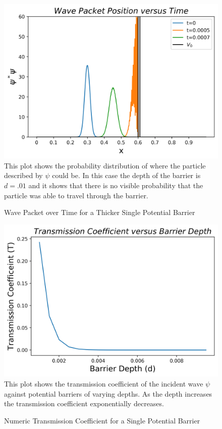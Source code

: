 \documentclass[twocolumn]{article}
\begin{document}
\begin{figure}[ht]
\centering
\caption{Wave Packet over Time for a Thicker Single Potential Barrier}
\includegraphics[scale=.5]{Position2b}
\small{This plot shows the probability distribution of where the particle described by $\psi$ could be. In this case the depth of the barrier is $d=.01$ and it shows that there is no visible probability that the particle was able to travel through the barrier.}
\end{figure}
\begin{figure}[h]
\centering
\caption{Numeric Transmission Coefficient for a Single Potential Barrier}
\includegraphics[scale=.5]{TransmissionD}
\small{This plot shows the transmission coefficient of the incident wave $\psi$ against potential barriers of varying depths. As the depth increases the transmission coefficient exponentially decreases.}
\end{figure}
\end{document}
